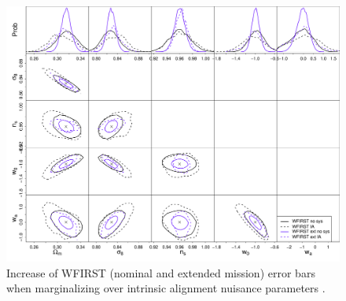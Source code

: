 \begin{figure}
\includegraphics[width=14cm]{Plots/forecasts/WFIRST_ia.pdf}
\caption{Increase of WFIRST (nominal and extended mission) error bars when marginalizing over intrinsic alignment nuisance parameters \citep[see][for comparison]{Krause2016}.} \label{fi:IA}
\end{figure}

